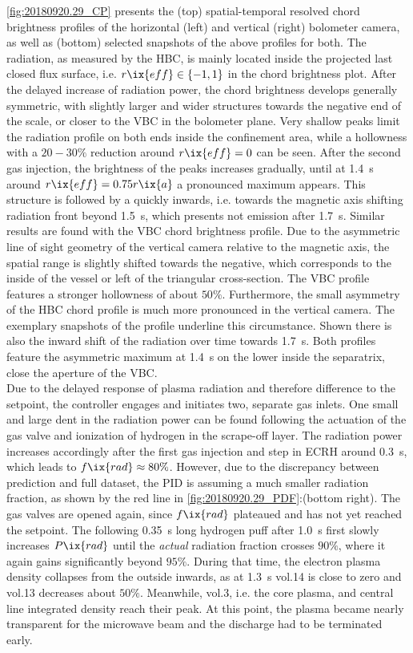 %
            \autoref{fig:20180920.29_CP} presents the (top) spatial-temporal resolved chord brightness profiles of the horizontal (left) and vertical (right) bolometer camera, as well as (bottom) selected snapshots of the above profiles for both. The radiation, as measured by the HBC, is mainly located inside the projected last closed flux surface, i.e. $r\ix{eff}\in\left\{-1, 1\right\}$ in the chord brightness plot. After the delayed increase of radiation power, the chord brightness develops generally symmetric, with slightly larger and wider structures towards the negative end of the scale, or closer to the VBC in the bolometer plane. Very shallow peaks limit the radiation profile on both ends inside the confinement area, while a hollowness with a $20-30\%$ reduction around $r\ix{eff}=0$ can be seen. After the second gas injection, the brightness of the peaks increases gradually, until at \SI{1.4}{\second} around $r\ix{eff}=0.75r\ix{a}$ a pronounced maximum appears. This structure is followed by a quickly inwards, i.e. towards the magnetic axis shifting radiation front beyond \SI{1.5}{\second}, which presents not emission after \SI{1.7}{\second}. Similar results are found with the VBC chord brightness profile. Due to the asymmetric line of sight geometry of the vertical camera relative to the magnetic axis, the spatial range is slightly shifted towards the negative, which corresponds to the inside of the vessel or left of the triangular cross-section. The VBC profile features a stronger hollowness of about $50\%$. Furthermore, the small asymmetry of the HBC chord profile is much more pronounced in the vertical camera. The exemplary snapshots of the profile underline this circumstance. Shown there is also the inward shift of the radiation over time towards \SI{1.7}{\second}. Both profiles feature the asymmetric maximum at \SI{1.4}{\second} on the lower inside the separatrix, close the aperture of the VBC.\\%
            Due to the delayed response of plasma radiation and therefore difference to the setpoint, the controller engages and initiates two, separate gas inlets. One small and large dent in the radiation power can be found following the actuation of the gas valve and ionization of hydrogen in the scrape-off layer. The radiation power increases accordingly after the first gas injection and step in ECRH around \SI{0.3}{\second}, which leads to $f\ix{rad}\approx 80\%$. However, due to the discrepancy between prediction and full dataset, the PID is assuming a much smaller radiation fraction, as shown by the red line in \cref{fig:20180920.29_PDF}:(bottom right). The gas valves are opened again, since $f\ix{rad}$ plateaued and has not yet reached the setpoint. The following \SI{0.35}{\second} long hydrogen puff after \SI{1.0}{\second} first slowly increases $P\ix{rad}$ until the \textit{actual} radiation fraction crosses $90\%$, where it again gains significantly beyond $95\%$. During that time, the electron plasma density collapses from the outside inwards, as at \SI{1.3}{\second} vol.14 is close to zero and vol.13 decreases about $50\%$. Meanwhile, vol.3, i.e. the core plasma, and central line integrated density reach their peak. At this point, the plasma became nearly transparent for the microwave beam and the discharge had to be terminated early.\\%
